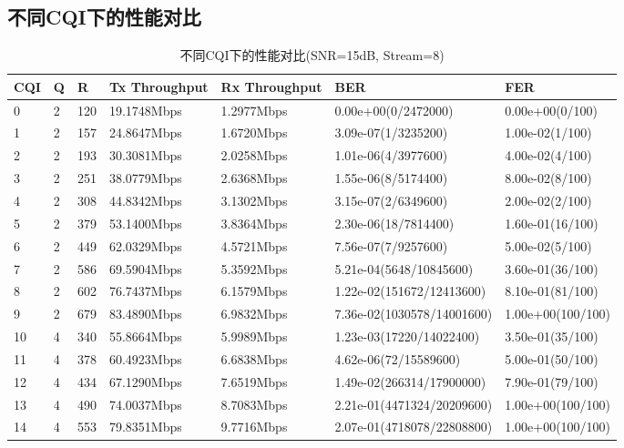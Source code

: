 \documentclass{article}
\begin{document}
\subsection{不同CQI下的性能对比}
\begin{table}[H]
	\caption{不同CQI下的性能对比(SNR=15dB, Stream=8)}
	\centering
	\begin{tabular}{|l|l|l|l|l|l|l|}%
		\hline  %
		CQI		& Q		& R		& Tx Throughput	& Rx Throughput	& BER					& FER				\\
		\hline
		0		& 2		& 120	& 19.1748Mbps	& 1.2977Mbps	& 0.00e+00(0/2472000)	& 0.00e+00(0/100)	\\
		\hline
		1		& 2		& 157	& 24.8647Mbps	& 1.6720Mbps	& 3.09e-07(1/3235200)	& 1.00e-02(1/100)	\\
		\hline
		2		& 2		& 193	& 30.3081Mbps	& 2.0258Mbps	& 1.01e-06(4/3977600)	& 4.00e-02(4/100)	\\
		\hline
		3		& 2		& 251	& 38.0779Mbps	& 2.6368Mbps	& 1.55e-06(8/5174400)	& 8.00e-02(8/100)	\\
		\hline
		4		& 2		& 308	& 44.8342Mbps	& 3.1302Mbps	& 3.15e-07(2/6349600)	& 2.00e-02(2/100)	\\
		\hline
		5		& 2		& 379	& 53.1400Mbps	& 3.8364Mbps	& 2.30e-06(18/7814400)	& 1.60e-01(16/100)	\\
		\hline
		6		& 2		& 449	& 62.0329Mbps	& 4.5721Mbps	& 7.56e-07(7/9257600)	& 5.00e-02(5/100)	\\
		\hline
		7		& 2		& 586	& 69.5904Mbps	& 5.3592Mbps	& 5.21e-04(5648/10845600)	& 3.60e-01(36/100)	\\
		\hline
		8		& 2		& 602	& 76.7437Mbps	& 6.1579Mbps	& 1.22e-02(151672/12413600)	& 8.10e-01(81/100)	\\
		\hline
		9		& 2		& 679	& 83.4890Mbps	& 6.9832Mbps	& 7.36e-02(1030578/14001600)	& 1.00e+00(100/100)	\\
		\hline
		10		& 4		& 340	& 55.8664Mbps	& 5.9989Mbps	& 1.23e-03(17220/14022400)	& 3.50e-01(35/100)	\\
		\hline
		11		& 4		& 378	& 60.4923Mbps	& 6.6838Mbps	& 4.62e-06(72/15589600)	& 5.00e-01(50/100)	\\
		\hline
		12		& 4		& 434	& 67.1290Mbps	& 7.6519Mbps	& 1.49e-02(266314/17900000)	& 7.90e-01(79/100)	\\
		\hline
		13		& 4		& 490	& 74.0037Mbps	& 8.7083Mbps	& 2.21e-01(4471324/20209600)	& 1.00e+00(100/100)	\\
		\hline
		14		& 4		& 553	& 79.8351Mbps	& 9.7716Mbps	& 2.07e-01(4718078/22808800)	& 1.00e+00(100/100)	\\

\end{tabular}
\end{table}
\end{document}
